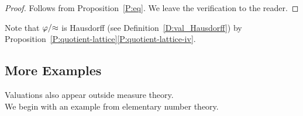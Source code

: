 \documentclass[main.tex]{subfiles}
\begin{document}
\begin{proof}
Follows from Proposition~\ref{P:eq}.
We leave the verification to the reader.
\end{proof}
\begin{rem}
Note that $\varphi/{\approx}$ is Hausdorff 
(see Definition~\ref{D:val_Hausdorff})
by Proposition~\ref{P:quotient-lattice}\ref{P:quotient-lattice-iv}.
\end{rem}
%

\subsection{More Examples}
\label{SS:more_examples}
%
%
\noindent
Valuations also appear outside measure theory.\\
We begin with an example from elementary number theory.
\end{document}
